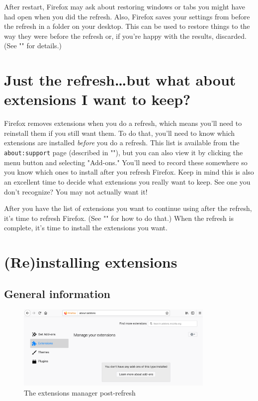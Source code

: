 \documentclass{tufte-handout}
\begin{document}
After restart, Firefox may ask about restoring windows or tabs you might have had open when you did the refresh.  Also, Firefox saves your settings from before the refresh in a folder on your desktop.  This can be used to restore things to the way they were before the refresh or, if you're happy with the results, discarded.  (See "" for details.)




\section{Just the refresh\ldots{}but what about extensions I want to keep?}
Firefox removes extensions when you do a refresh, which means you'll need to reinstall them if you still want them.  To do that, you'll need to know which extensions are installed \emph{before} you do a refresh.  This list is available from the \texttt{about:support} page (described in ""), but you can also view it by clicking the menu button and selecting "Add-ons."  You'll need to record these somewhere so you know which ones to install after you refresh Firefox.  Keep in mind this is also an excellent time to decide what extensions you really want to keep.  See one you don't recognize?  You may not actually want it!

After you have the list of extensions you want to continue using after the refresh, it's time to refresh Firefox.  (See "" for how to do that.)  When the refresh is complete, it's time to install the extensions you want.





\section{(Re)installing extensions}



\subsection{General information}

\begin{figure}[h]
	\centering
	\includegraphics[width=0.85\textwidth]{images/extensions-post-refresh.png}
	\caption{The extensions manager post-refresh }
	\label{fig:extensions-post-refresh}
\end{figure}
\end{document}
